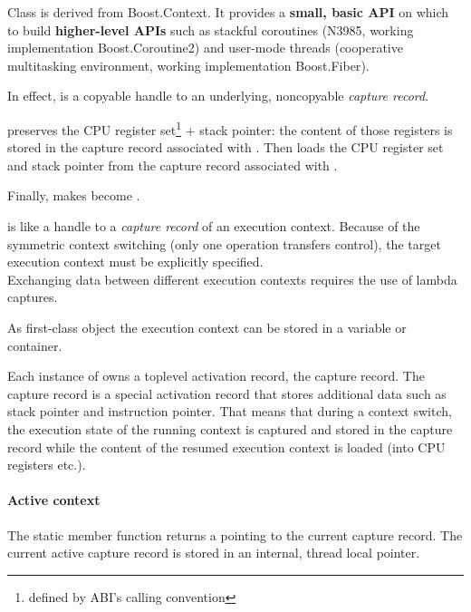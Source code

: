 Class \ectx is derived from Boost.Context\cite{bcontext}. It
provides a {\bfseries small, basic API} on which to build {\bfseries
higher-level APIs} such as stackful coroutines (N3985\cite{N3985}, working
implementation Boost.Coroutine2\cite{bcoroutine2}) and user-mode threads
(cooperative multitasking environment, working
implementation Boost.Fiber\cite{bfiber}).

In effect,  is a copyable handle to an underlying,
noncopyable \emph{capture record}.

 preserves the CPU register
set\footnote{defined by ABI's calling convention} + stack pointer: the content of
those registers is stored in the capture record associated with
. Then  loads the CPU register
set and stack pointer from the capture record associated with .

Finally, 
makes  become .

\ectx is like a handle to a \emph{capture record} of an execution
context.
Because of the symmetric context switching (only one operation transfers
control), the target execution context must be explicitly specified.\\
Exchanging data between different execution contexts requires the use of lambda
captures.

As first-class object the execution context can be stored in a variable or
container.

Each instance of \ectx owns a toplevel activation record, the capture record.
The capture record is a special activation record that stores additional data
such as stack pointer and instruction pointer. That means that during a
context switch, the execution state of the running context is captured and
stored in the capture record while the content of the resumed execution
context is loaded (into CPU registers etc.).

\paragraph*{Active context}
The static member function \ectxcurrent returns a \ectx pointing to the
current capture record. The current active capture record is stored in an
internal, thread local pointer.

